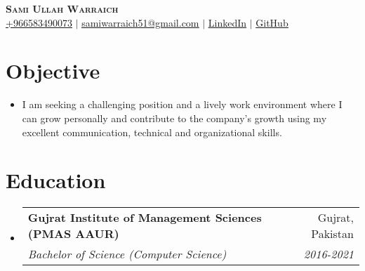 \documentclass[letterpaper,11pt]{article}
\makeatletter
\newcommand{\resumeItem}[1]{
  \item\small{
    {#1 \vspace{-2pt}}
  }
}
\newcommand{\resumeSubheading}[4]{
  \vspace{-1pt}\item
    \begin{tabular*}{0.97\textwidth}[t]{l@{\extracolsep{\fill}}r}
      \textbf{#1} & #2 \\
      \textit{\small#3} & \textit{\small #4} \\
    \end{tabular*}\vspace{-6pt}
}
\newcommand{\resumeSubHeadingListStart}{\begin{itemize}[leftmargin=0.15in, label={}]}
\newcommand{\resumeSubHeadingListEnd}{\end{itemize}}
\newcommand{\resumeItemListStart}{\begin{itemize}}
\newcommand{\resumeItemListEnd}{\end{itemize}\vspace{-4pt}}
\makeatother
\begin{document}

\begin{center}
    \textbf{\Huge \scshape Sami Ullah Warraich} \\ \vspace{1pt}
    \small 
    \href{https://wa.me/+966583490073}{\underline{+966583490073}} $|$ 
    \href{mailto:samiwarraich51@gmail.com}{\underline{samiwarraich51@gmail.com}} $|$ 
    \href{https://linkedin.com/in/samiwarra1ch}{\underline{LinkedIn}} $|$
    \href{https://github.com/samiwarraich}{\underline{GitHub}} 
\end{center}



\section{Objective}
     \resumeItemListStart
        \resumeItem{I am seeking a challenging position and a lively work environment where I can grow personally and contribute to the company’s growth using my excellent communication, technical and organizational skills.}\vspace{-10pt}
    \resumeItemListEnd

\section{Education}
  \resumeSubHeadingListStart
    \resumeSubheading
      {Gujrat Institute of Management Sciences (PMAS AAUR)}{Gujrat, Pakistan}
      {Bachelor of Science (Computer Science)}{2016-2021}
  \resumeSubHeadingListEnd


\end{document}
